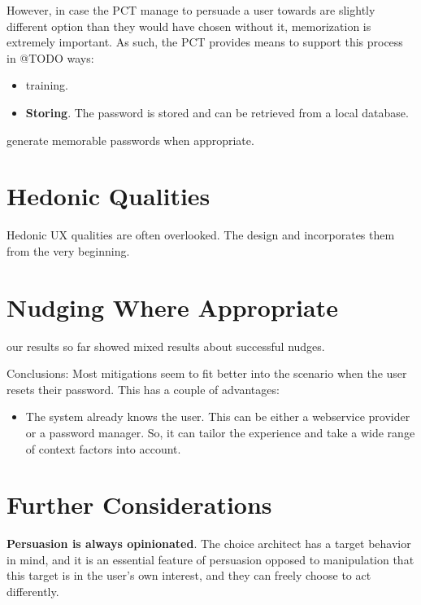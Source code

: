 However, in case the PCT manage to persuade a user towards are slightly different option than they would have chosen without it, memorization is extremely important. As such, the PCT provides means to support this process in @TODO ways:
\begin{itemize}
\item training. 
\item \textbf{Storing}. The password is stored and can be retrieved from a local database. 
\end{itemize}

generate memorable passwords when appropriate. 

\section{Hedonic Qualities}
Hedonic UX qualities are often overlooked. The design and incorporates them from the very beginning. 

\section{Nudging Where Appropriate}
our results so far showed mixed results about successful nudges. 


Conclusions: Most mitigations seem to fit better into the scenario when the user resets their password. This has a couple of advantages:
\begin{itemize}
	\item The system already knows the user. This can be either a webservice provider or a password manager. So, it can tailor the experience and take a wide range of context factors into account. 
\end{itemize}


\section{Further Considerations}

\textbf{Persuasion is always opinionated}. The choice architect has a target behavior in mind, and it is an essential feature of persuasion opposed to manipulation that this target is in the user's own interest, and they can freely choose to act differently. 


